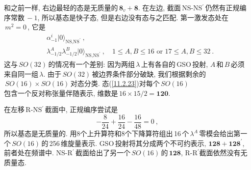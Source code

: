 和之前一样, 右边最轻的态是无质量的$\,\mathbf{8}_{v}+\mathbf{8}$. 在左边, 截面\,NS-NS$^{\prime}$\,仍然有正规编序常数$\,-1$, 所以基态是快子态, 但是右边没有态与之匹配. 第一激发态处在$\,m^{2}=0\,$, 它是
\begin{align}
    & \alpha_{-1}^{i}\lvert0\rangle_{\text{NS,NS}^{\prime}} \:, \nonumber \\
    & \lambda^{A}_{-1/2}\lambda^{B}_{-1/2} \lvert0\rangle_{\text{NS,NS}^{\prime}} \:, \quad
    1\leq A,B\leq 16 \text{ or } 17\leq A,B \leq 32 \:. \label{11.2.23}
\end{align}
这与$\,SO(32)\,$的情况有一个差别: 因为两组$\,\lambda\,$上有各自的\,GSO\,投射, $A\,$和$\,B\,$必须来自同一组$\,\lambda$. 由于$\,SO(32)\,$被边界条件部分破缺, 我们根据剩余的$\,SO(16)\times SO(16)\,$对态分类. 态(\ref{11.2.23})对每个$\,SO(16)\,$\\包含一个反对称张量伴随表示, 维数是$\,16\times 15/2=\mathbf{120}$. 

在左移\,R-NS$^{\prime}\,$截面中, 正规编序尝试是
\begin{equation}
    -\frac{8}{24} + \frac{16}{24} - \frac{16}{48} =0 \:, \label{11.2.24}
\end{equation}
所以基态是无质量的. 用8个上升算符和8个下降算符组出\,16\,个$\,\lambda^{A}\,$零模会给出第一个$\,SO(16)\,$的\,256\,维旋量表示. GSO\,投射将其分成两个不可约表示, $\mathbf{128}+\mathbf{128}^{\prime}$, 前者处在频谱中. NS-R$^{\prime}$\,截面给出了另一个$\,SO(16)\,$的$\,\mathbf{128}$, R-R$^{\prime}$截面依然没有无质量态.

